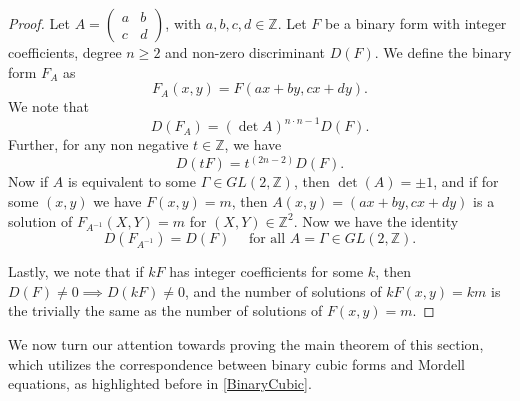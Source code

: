 \documentclass[12pt]{amsart}
\theoremstyle{plain}
\theoremstyle{definition}
\theoremstyle{remark}
\numberwithin{equation}{section}
\numberwithin{thm}{section}
\theoremstyle{named}
\theoremstyle{named}
\begin{document}
\begin{proof}
Let \( A = \begin{pmatrix} a & b \\ c & d \end{pmatrix} \), with \( a, b, c, d \in \mathbb{Z}\). Let \( F \) be a binary form with integer coefficients, degree $n \geq 2$ and non-zero discriminant $D(F)$. We define the binary form $F_{A}$ as 
\begin{equation*}
    F_{A}(x,y) = F(ax + by, cx + dy).
\end{equation*}
We note that 
\begin{equation*}\label{4.1}    
D(F_{A}) = (\det A)^{n \cdot n-1} D(F).
\end{equation*}
Further, for any non negative $t \in \mathbb{Z}$, we have \begin{equation*}
D(t F) = t^{(2n-2)} D(F).
\end{equation*}
Now if $A$ is equivalent to some $\Gamma \in GL(2, \mathbb Z)$, then $\det(A) = \pm 1$, and if for some $(x,y)$ we have $F(x,y) = m$, then $A(x,y) = (ax +by, cx + dy)$ is a solution of $F_{A^{-1}} (X,Y) = m$ for $(X,Y) \in \mathbb{Z}^2.$ Now we have the identity \begin{equation*}
    D({F_{A^{-1}}}) = D(F) \quad \text{ for all } A = \Gamma \in GL(2, \mathbb Z).
\end{equation*}

Lastly, we note that if $kF$ has integer coefficients for some $k$, then $D(F) \neq 0 \implies D(kF) \neq 0$, and the number of solutions of $kF(x,y) = km $ is the trivially the same as the number of solutions of $F(x,y) =m.$  
\end{proof}
We now turn our attention towards proving the main theorem  of this section, which utilizes the correspondence between binary cubic forms and Mordell equations, as highlighted before in \ref{BinaryCubic}.
\end{document}
